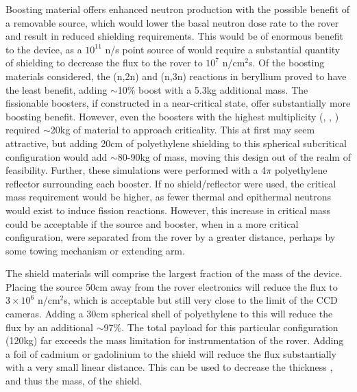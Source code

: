 \documentclass{mc2015}
\begin{document}
Boosting material offers enhanced neutron production with the possible benefit of a removable source, which would lower the basal neutron dose rate to the rover and result in reduced shielding requirements. This would be of enormous benefit to the device, as a $10^{11}$ n/s point source of  would require a substantial quantity of shielding to decrease the flux to the rover to $10^{7}$ n/cm$^2$s. Of the boosting materials considered, the (n,2n) and (n,3n) reactions in beryllium proved to have the least benefit, adding $\sim$10\% boost with a 5.3kg additional mass. The fissionable boosters, if constructed in a near-critical state, offer substantially more boosting benefit. However, even the boosters with the highest multiplicity (, , ) required $\sim$20kg of material to approach criticality. This at first may seem attractive, but adding 20cm of polyethylene shielding to this spherical subcritical configuration would add $\sim$80-90kg of mass, moving this design out of the realm of feasibility. Further, these simulations were performed with a 4$\pi$ polyethylene reflector surrounding each booster. If no shield/reflector were used, the critical mass requirement would be higher, as fewer thermal and epithermal neutrons would exist to induce fission reactions. However, this increase in critical mass could be acceptable if the source and booster, when in a more critical configuration, were separated from the rover by a greater distance, perhaps by some towing mechanism or extending arm. 

The shield materials will comprise the largest fraction of the mass of the device. Placing the source 50cm away from the rover electronics will reduce the flux to $3 \times 10^6$ n/cm$^2$s, which is acceptable but still very close to the limit of the CCD cameras. Adding a 30cm spherical shell of polyethylene to this will reduce the flux by an additional $\sim$97\%. The total payload for this particular configuration (120kg) far exceeds the mass limitation for instrumentation of the rover.  Adding a foil of cadmium or gadolinium to the shield will reduce the flux substantially with a very small linear distance. This can be used to decrease the thickness , and thus the mass, of the shield.
\end{document}
